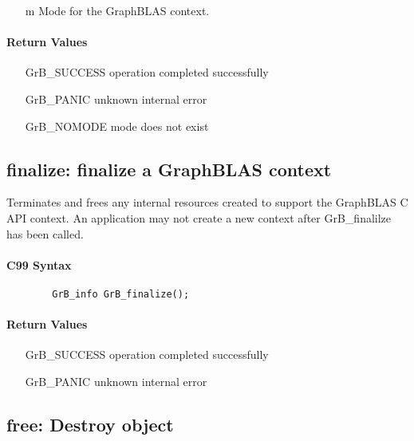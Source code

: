\begin{itemize}[leftmargin=1.1in]
	\item[{\sf m}] Mode for the GraphBLAS context.
\end{itemize}

\paragraph{Return Values}

\begin{itemize}[leftmargin=2.1in]
\item[{\sf GrB\_SUCCESS}]        operation completed successfully
\item[{\sf GrB\_PANIC}]          unknown internal error
\item[{\sf GrB\_NOMODE}]         mode does not exist
\end{itemize}


\subsection{{\sf finalize}: finalize a GraphBLAS context}

Terminates and frees any internal resources created to 
support the GraphBLAS C API context.
An application may not create a new context after 
{\sf GrB\_finalilze} has been called.

\paragraph{C99 Syntax}

\begin{verbatim}
        GrB_info GrB_finalize();
\end{verbatim}

\paragraph{Return Values}

\begin{itemize}[leftmargin=2.1in]
\item[{\sf GrB\_SUCCESS}]        operation completed successfully
\item[{\sf GrB\_PANIC}]          unknown internal error
\end{itemize}

\subsection{{\sf free}: Destroy object}

